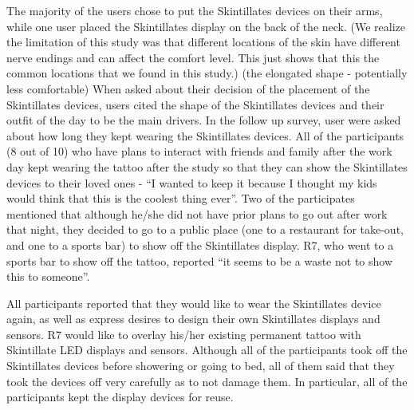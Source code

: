 \documentclass{sigchi}
\begin{document}
The majority of the users chose to put the Skintillates devices on their arms, while one user placed the Skintillates display on the back of the neck. (We realize the limitation of this study was that different locations of the skin have different nerve endings and can affect the comfort level. This just shows that this the common locations that we found in this study.) (the elongated shape - potentially less comfortable) When asked about their decision of the placement of the Skintillates devices, users cited the shape of the Skintillates devices and their outfit of the day to be the main drivers. In the follow up survey, user were asked about how long they kept wearing the Skintillates devices. All of the participants (8 out of 10) who have plans to interact with friends and family after the work day kept wearing the tattoo after the study so that they can show the Skintillates devices to their loved ones - ``I wanted to keep it because I thought my kids would think that this is the coolest thing ever''. Two of the participates mentioned that although he/she did not have prior plans to go out after work that night, they decided to go to a public place (one to a restaurant for take-out, and one to a sports bar) to show off the Skintillates display. R7, who went to a sports bar to show off the tattoo, reported ``it seems to be a waste not to show this to someone''. 

All participants reported that they would like to wear the Skintillates device again, as well as express desires to design their own Skintillates displays and sensors. R7 would like to overlay his/her existing permanent tattoo with Skintillate LED displays and sensors. Although all of the participants took off the Skintillates devices before showering or going to bed, all of them said that they took the devices off very carefully as to not damage them. In particular, all of the participants kept the display devices for reuse. 
\end{document}
